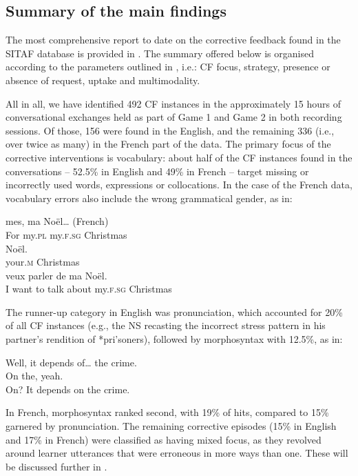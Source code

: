 \documentclass[output=paper,colorlinks,citecolor=brown,modfonts,nonflat]{../langscibook}
\begin{document}
\subsection{Summary of the main findings}\label{sec:scheuer:4.2}

The most comprehensive report to date on the corrective feedback found in the SITAF database is provided in \citet{ScheuerHorgues2020}. The summary offered below is organised according to the parameters outlined in , i.e.: CF focus, strategy, presence or absence of request, uptake and multimodality.

All in all, we have identified 492 CF instances in the approximately 15 hours of conversational exchanges held as part of Game 1 and Game 2 in both recording sessions. Of those, 156 were found in the English, and the remaining 336 (i.e., over twice as many) in the French part of the data. The primary focus of the corrective interventions is vocabulary: about half of the CF instances found in the conversations – 52.5\% in English and 49\% in French – target missing or incorrectly used words, expressions or collocations. In the case of the French data, vocabulary errors also include the wrong grammatical gender, as in:

\ea\label{ex:scheuer:6}
{\NNS}
 {mes,}    {ma}    {Noël…}   (French)\\
      For my.\textsc{pl}    my.\textsc{f.sg}  Christmas\\

{\NS}
    {Noël.}\\
your{}.\textsc{m}    Christmas\\

{\NNS}
 {veux} {parler} {de}  {ma}     {Noël.}\\
I want to talk about    my.\textsc{f.sg}  Christmas\\
\z

The runner-up category in English was pronunciation, which accounted for 20\% of all CF instances (e.g., the NS recasting the incorrect stress pattern in his partner’s rendition of *pri'soners), followed by morphosyntax with 12.5\%, as in:

\ea\label{ex:scheuer:7}
{\NNS} {Well,} {it} {depends} {of…} {the} {crime.}\\
{\NS} {On} {the,} {yeah.}\\
{\NNS} {On?} {It} {depends} {on} {the} {crime.}
\z

In French, morphosyntax ranked second, with 19\% of hits, compared to 15\% garnered by pronunciation. The remaining corrective episodes (15\% in English and 17\% in French) were classified as having mixed focus, as they revolved around learner utterances that were erroneous in more ways than one. These will be discussed further in . 
\end{document}
